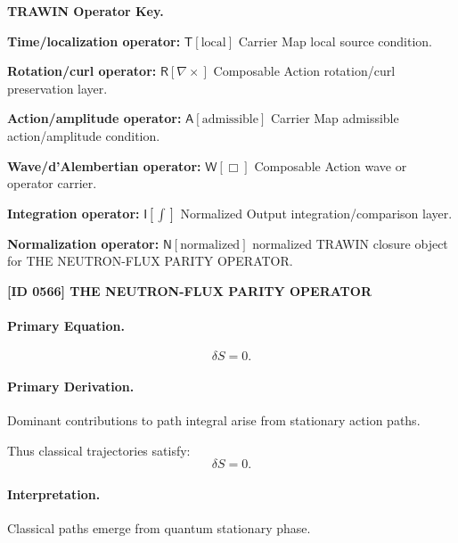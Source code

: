 \par\vspace{0.45\baselineskip}
\noindent\begin{minipage}[t]{\linewidth}
\begingroup
\small
\raggedright
\textbf{TRAWIN Operator Key.}\par
\noindent\textbf{Time/localization operator:} $\mathsf{T}\!\left[\mathrm{local}\right]$ Carrier Map local source condition.\par
\noindent\textbf{Rotation/curl operator:} $\mathsf{R}\!\left[\nabla\times\right]$ Composable Action rotation/curl preservation layer.\par
\noindent\textbf{Action/amplitude operator:} $\mathsf{A}\!\left[\mathrm{admissible}\right]$ Carrier Map admissible action/amplitude condition.\par
\noindent\textbf{Wave/d'Alembertian operator:} $\mathsf{W}\!\left[\Box\right]$ Composable Action wave or operator carrier.\par
\noindent\textbf{Integration operator:} $\mathsf{I}\!\left[\int\right]$ Normalized Output integration/comparison layer.\par
\noindent\textbf{Normalization operator:} $\mathsf{N}\!\left[\mathrm{normalized}\right]$ normalized TRAWIN closure object for THE NEUTRON-FLUX PARITY OPERATOR.\par
\endgroup
\end{minipage}

\clearpage
\noindent\textbf{[ID 0566] THE NEUTRON-FLUX PARITY OPERATOR}\par
\vspace{0.35em}
\paragraph{Primary Equation.}
\begin{equation}
\delta S = 0.
\end{equation}

\paragraph{Primary Derivation.}
Dominant contributions to path integral arise from stationary action paths.

Thus classical trajectories satisfy:
\begin{equation}
\boxed{\delta S = 0.}
\end{equation}

\paragraph{Interpretation.}
Classical paths emerge from quantum stationary phase.

